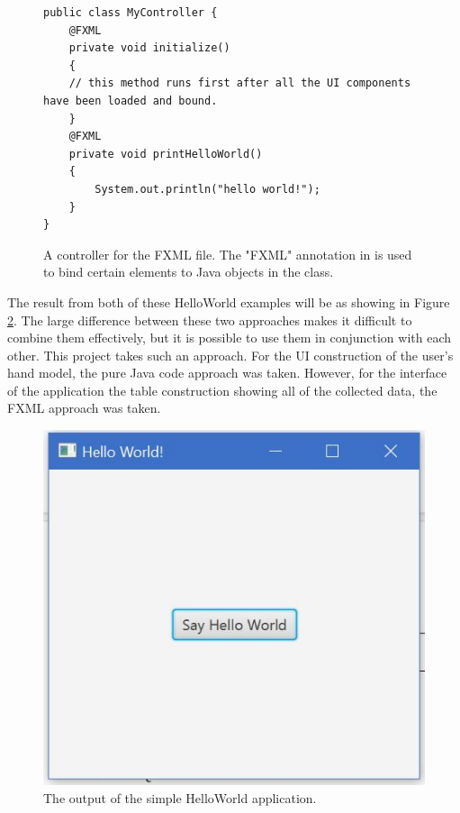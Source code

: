 \begin{figure}[th]
\centering
\begin{lstlisting}
public class MyController {
	@FXML
	private void initialize() 
	{
	// this method runs first after all the UI components have been loaded and bound.
	}
	@FXML
	private void printHelloWorld() 
	{
		System.out.println("hello world!");
	}
}
\end{lstlisting}
\caption[Controller for FXML]{A controller for the FXML file. The "FXML" annotation in is used to bind certain elements to Java objects in the class.}
\label{fig:simpleController}
\end{figure}

The result from both of these HelloWorld examples will be as showing in Figure \ref{fig:helloWorldResult}. The large difference between these two approaches makes it difficult to combine them effectively, but it is possible to use them in conjunction with each other. This project takes such an approach. For the UI construction of the user's hand model, the pure Java code approach was taken. However, for the interface of the application the table construction showing all of the collected data, the FXML approach was taken. 

\begin{figure}[th]
\centering
\includegraphics[scale=0.5]{Figures/helloWorldResult.JPG}
\caption[JavaFX Application Output]{The output of the simple HelloWorld application.}
\label{fig:helloWorldResult}
\end{figure}

